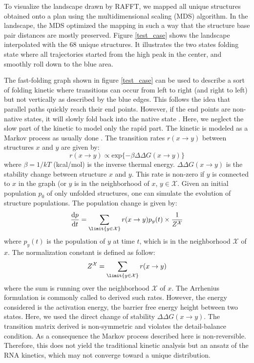 \documentclass[a4paper,12pt]{article}
\begin{document}
To visualize the landscape drawn by RAFFT, we mapped all unique structures
obtained onto a plan using the multidimensional scaling (MDS) algorithm. In the
landscape, the MDS optimized the mapping in such a way that the structure base
pair distances are mostly preserved. Figure \ref{test_case} shows the landscape
interpolated with the 68 unique structures. It illustrates the two states
folding state where all trajectories started from the high peak in the center,
and smoothly roll down to the blue area.

The fast-folding graph shown in figure \ref{test_case} can be used to describe a
sort of folding kinetic where transitions can occur from left to right (and
right to left) but not vertically as described by the blue edges. This follows
the idea that parallel paths quickly reach their end points. However, if the end
points are non-native states, it will slowly fold back into the native state
\cite{pan97_foldin_rna_invol_paral_pathw}. Here, we neglect the slow part of the
kinetic to model only the rapid part. The kinetic is modeled as a Markov process
as usually done \cite{lorenz20_effic_comput_base_probab_multi_rna_foldin}. The
transition rates \(r(x\rightarrow y)\) between structures \(x\) and \(y\) are given by:
\begin{equation}
r(x\rightarrow y) \propto \text{exp}\{-\beta \Delta \Delta G(x\rightarrow y)\}
\end{equation}
where \(\beta=1/kT\) (kcal/mol) is the inverse thermal energy. \(\Delta \Delta
G(x\rightarrow y)\) is the stability change between structure \(x\) and \(y\). This
rate is non-zero if \(y\) is connected to \(x\) in the graph (or \(y\) is in the
neighborhood of \(x\), \(y \in \mathcal{X}\). Given an initial population \(p_{0}\) of
only unfolded structures, one can simulate the evolution of structure
populations. The population change is given by:
\begin{equation}
\frac{\text{d}p}{\text{d}t} = \sum_\limit{y \in \mathcal{X}} r(x\rightarrow y) p_{y}(t) \times \frac{1}{Z^\mathcal{X}}
\end{equation}
where \(p_{y}(t)\) is the population of \(y\) at time \(t\), which is in the
neighborhood \(\mathcal{X}\) of \(x\). The normalization constant is defined as
follow:
\begin{equation}
Z^\mathcal{X} = \sum_\limit{y \in \mathcal{X}} r(x \rightarrow y)
\end{equation}
where the sum is running over the neighborhood \(\mathcal{X}\) of \(x\). The
Arrhenius formulation is commonly called to derived such rates. However, the
energy considered is the activation energy, the barrier free energy height
between two states. Here, we used the direct change of stability \(\Delta \Delta
G (x \rightarrow y)\). The transition matrix derived is non-symmetric and
violates the detail-balance condition. As a consequence the Markov process
described here is non-reversible. Therefore, this does not yield the traditional
kinetic analysis but an ansatz of the RNA kinetics, which may not converge
toward a unique distribution.
\end{document}
